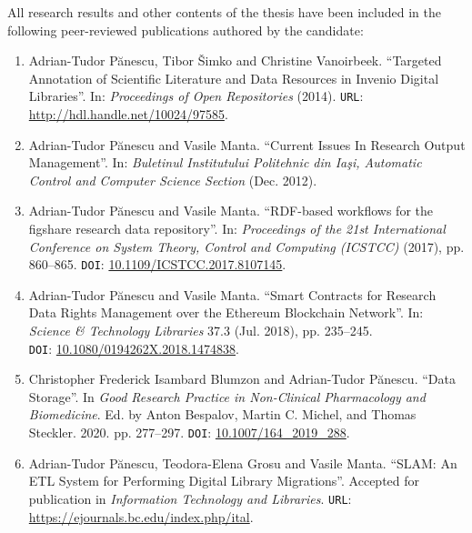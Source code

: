 All research results and other contents of the thesis have been included in the following peer-reviewed publications authored by the candidate:
\begin{enumerate}
    \item Adrian-Tudor P\u{a}nescu, Tibor \v{S}imko and Christine Vanoirbeek. ``Targeted Annotation of Scientific Literature and Data Resources in Invenio Digital Libraries''. In: \emph{Proceedings of Open Repositories} (2014). \texttt{URL}: \url{http://hdl.handle.net/10024/97585}.
    
    \item Adrian-Tudor P\u{a}nescu and Vasile Manta. ``Current Issues In Research Output Management''. In: \emph{Buletinul Institutului Politehnic din Ia\c{s}i, Automatic Control and Computer Science Section} (Dec. 2012).
    
    \item Adrian-Tudor P\u{a}nescu and Vasile Manta. ``RDF-based workflows for the figshare research data repository''. In: \emph{Proceedings of the  21st International Conference on System Theory, Control and Computing (ICSTCC)} (2017), pp. 860--865. \texttt{DOI}: \href{https://doi.org/10.1109/ICSTCC.2017.8107145}{10.1109/ICSTCC.2017.8107145}.
    
    \item Adrian-Tudor P\u{a}nescu and Vasile Manta. ``Smart Contracts for Research Data Rights Management over the Ethereum Blockchain Network''. In: \emph{Science \& Technology Libraries} 37.3 (Jul. 2018), pp. 235--245.\\\texttt{DOI}: \href{https://doi.org/10.1080/0194262X.2018.1474838}{10.1080/0194262X.2018.1474838}.
    
    \item Christopher Frederick Isambard Blumzon and Adrian-Tudor P\u{a}nescu. ``Data Storage''. In \emph{Good Research Practice in Non-Clinical Pharmacology and\\Biomedicine}. Ed. by Anton Bespalov, Martin C. Michel, and Thomas Steckler. 2020. pp. 277--297. \texttt{DOI}: \href{https://doi.org/10.1007/164\_2019\_288}{10.1007/164\_2019\_288}.
    
    \item Adrian-Tudor P\u{a}nescu, Teodora-Elena Grosu and Vasile Manta. ``SLAM: An ETL System for Performing Digital Library Migrations''. Accepted for publication in \emph{Information Technology and Libraries}. \texttt{URL}: \url{https://ejournals.bc.edu/index.php/ital}.
\end{enumerate}

